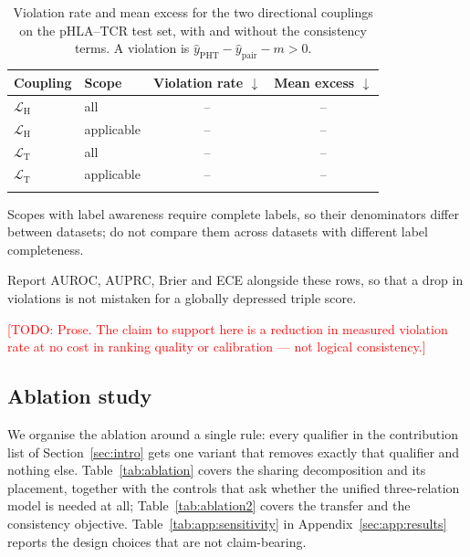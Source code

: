\documentclass[webpdf,modern,large,namedate]{oup-authoring-template}
\theoremstyle{thmstyleone}
\theoremstyle{thmstyletwo}
\theoremstyle{thmstylethree}
\newcommand{\NA}{--}
\DeclareRobustCommand{\TODO}[1]{\textcolor{red}{[TODO: #1]}}
\newcommand{\PHT}{pHLA--TCR}
\newcommand{\PHTm}{\mathrm{PHT}}
\begin{document}
\begin{table}[!t]
\caption{Violation rate and mean excess for the two directional couplings on
the \PHT{} test set, with and without the consistency terms. A violation is
$\hat y_{\PHTm}-\hat y_{\text{pair}}-m>0$.\label{tab:consistency-results}}
\begin{tabular*}{\columnwidth}{@{\extracolsep\fill}llcc@{\extracolsep\fill}}
\toprule
Coupling & Scope & Violation rate $\downarrow$ & Mean excess $\downarrow$\\
\midrule
$\mathcal{L}_{\mathrm{H}}$ & all        & \NA & \NA\\
$\mathcal{L}_{\mathrm{H}}$ & applicable & \NA & \NA\\
$\mathcal{L}_{\mathrm{T}}$ & all        & \NA & \NA\\
$\mathcal{L}_{\mathrm{T}}$ & applicable & \NA & \NA\\
\botrule
\end{tabular*}
\begin{tablenotes}%
\item Scopes with label awareness require complete labels, so their
denominators differ between datasets; do not compare them across datasets with
different label completeness.
\item Report AUROC, AUPRC, Brier and ECE alongside these rows, so that a drop
in violations is not mistaken for a globally depressed triple score.
\end{tablenotes}
\end{table}

\TODO{Prose. The claim to support here is a reduction in measured violation
rate at no cost in ranking quality or calibration --- not logical consistency.}

\subsection{Ablation study}\label{sec:results:ablation}

We organise the ablation around a single rule: every qualifier in the
contribution list of Section~\ref{sec:intro} gets one variant that removes
exactly that qualifier and nothing else. Table~\ref{tab:ablation} covers the
sharing decomposition and its placement, together with the controls that ask
whether the unified three-relation model is needed at all;
Table~\ref{tab:ablation2} covers the transfer and the consistency objective.
Table~\ref{tab:app:sensitivity} in Appendix~\ref{sec:app:results} reports the
design choices that are not claim-bearing.
\end{document}
